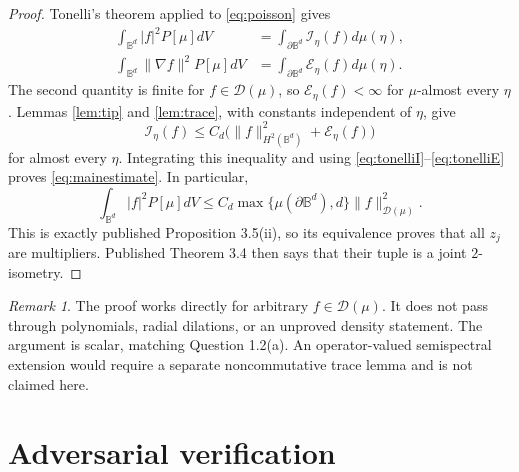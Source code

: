 \documentclass[11pt]{article}
\theoremstyle{remark}
\newtheorem{remark}{Remark}
\newcommand{\Bd}{\mathbb B^d}
\newcommand{\Sd}{\partial\mathbb B^d}
\newcommand{\Eeta}{\mathcal E_{\eta}}
\newcommand{\Ieta}{\mathcal I_{\eta}}
\begin{document}
\begin{proof}
Tonelli's theorem applied to \eqref{eq:poisson} gives
\begin{align}
 \int_{\Bd}|f|^2P[\mu]dV
 &=\int_{\Sd}\Ieta(f)d\mu(\eta),\label{eq:tonelliI}\\
 \int_{\Bd}\lVert\nabla f\rVert^2P[\mu]dV
 &=\int_{\Sd}\Eeta(f)d\mu(\eta).\label{eq:tonelliE}
\end{align}
The second quantity is finite for $f\in\mathscr D(\mu)$, so
$\Eeta(f)<\infty$ for $\mu$-almost every $\eta$.  Lemmas
\ref{lem:tip} and \ref{lem:trace}, with constants independent of $\eta$, give
\[
 \Ieta(f)\leq C_d
 \bigl(\lVert f\rVert_{H^2(\Bd)}^2+\Eeta(f)\bigr)
\]
for almost every $\eta$.  Integrating this inequality and using
\eqref{eq:tonelliI}--\eqref{eq:tonelliE} proves
\eqref{eq:mainestimate}.  In particular,
\[
 \int_{\Bd}|f|^2P[\mu]dV
 \leq C_d\max\{\mu(\Sd),d\}\lVert f\rVert_{\mathscr D(\mu)}^2.
\]
This is exactly published Proposition 3.5(ii), so its equivalence proves that
all $z_j$ are multipliers.  Published Theorem 3.4 then says that their tuple
is a joint $2$-isometry.
\end{proof}

\begin{remark}
The proof works directly for arbitrary $f\in\mathscr D(\mu)$.  It does not
pass through polynomials, radial dilations, or an unproved density statement.
The argument is scalar, matching Question 1.2(a).  An operator-valued
semispectral extension would require a separate noncommutative trace lemma
and is not claimed here.
\end{remark}

\section{Adversarial verification}

\begingroup\small
\end{document}
